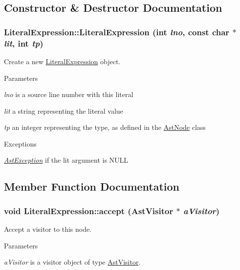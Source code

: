 \subsection{Constructor \& Destructor Documentation}
\hypertarget{classLiteralExpression_a4401fd6efc3f6808d28d64a734070df6}{
\subsubsection[{LiteralExpression}]{\setlength{\rightskip}{0pt plus 5cm}LiteralExpression::LiteralExpression (int {\em lno}, \/  const char $\ast$ {\em lit}, \/  int {\em tp})}}
\label{classLiteralExpression_a4401fd6efc3f6808d28d64a734070df6}
Create a new \hyperlink{classLiteralExpression}{LiteralExpression} object.


\begin{DoxyParams}{Parameters}
\item[{\em lno}]is a source line number with this literal \item[{\em lit}]a string representing the literal value \item[{\em tp}]an integer representing the type, as defined in the \hyperlink{classAstNode}{AstNode} class \end{DoxyParams}

\begin{DoxyExceptions}{Exceptions}
\item[{\em \hyperlink{classAstException}{AstException}}]if the lit argument is NULL \end{DoxyExceptions}


\subsection{Member Function Documentation}
\hypertarget{classLiteralExpression_a02054e805df96a9d75ea64acc35d15a7}{
\subsubsection[{accept}]{\setlength{\rightskip}{0pt plus 5cm}void LiteralExpression::accept ({\bf AstVisitor} $\ast$ {\em aVisitor})}}
\label{classLiteralExpression_a02054e805df96a9d75ea64acc35d15a7}
Accept a visitor to this node. 
\begin{DoxyParams}{Parameters}
\item[{\em aVisitor}]is a visitor object of type \hyperlink{classAstVisitor}{AstVisitor}. \end{DoxyParams}


